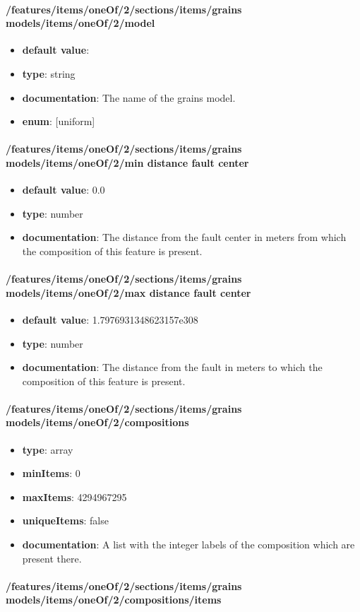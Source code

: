 \paragraph{/features/items/oneOf/2/sections/items/grains models/items/oneOf/2/model}
\begin{itemize}\item {\bf default value}: 
\item {\bf type}: string
\item {\bf documentation}: The name of the grains model.
\item {\bf enum}: [uniform]\end{itemize}\paragraph{/features/items/oneOf/2/sections/items/grains models/items/oneOf/2/min distance fault center}
\begin{itemize}\item {\bf default value}: 0.0
\item {\bf type}: number
\item {\bf documentation}: The distance from the fault center in meters from which the composition of this feature is present.
\end{itemize}\paragraph{/features/items/oneOf/2/sections/items/grains models/items/oneOf/2/max distance fault center}
\begin{itemize}\item {\bf default value}: 1.7976931348623157e308
\item {\bf type}: number
\item {\bf documentation}: The distance from the fault in meters to which the composition of this feature is present.
\end{itemize}\paragraph{/features/items/oneOf/2/sections/items/grains models/items/oneOf/2/compositions}
\begin{itemize}\item {\bf type}: array
\item {\bf minItems}: 0
\item {\bf maxItems}: 4294967295
\item {\bf uniqueItems}: false
\item {\bf documentation}: A list with the integer labels of the composition which are present there.
\end{itemize}\paragraph{/features/items/oneOf/2/sections/items/grains models/items/oneOf/2/compositions/items}
